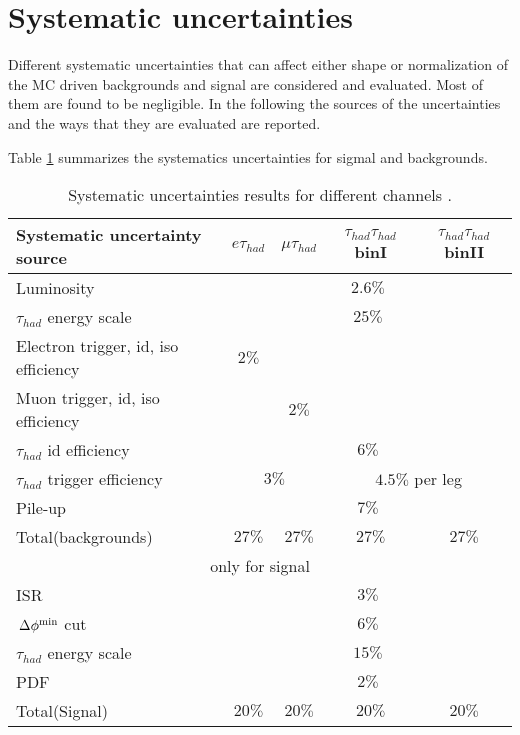\section{Systematic uncertainties}
\label{sect:sys}
Different systematic uncertainties that can affect either shape or normalization of the MC driven backgrounds
and signal are considered and evaluated.
Most of them are found to be negligible. In the following the sources of the uncertainties and the ways that they are evaluated are reported. 

Table \ref{Tab.SYS} summarizes the systematics uncertainties for sigmal and backgrounds.
\begin{table}[!Hhtb]
\begin{center}
\small{
\begin{tabular}{|l|c|c|c|c|}
\hline\hline
Systematic uncertainty source & $e\tau_{had}$ & $\mu\tau_{had}$ & $\tau_{had}\tau_{had}$ binI & $\tau_{had}\tau_{had}$ binII\\
\hline\hline
{Luminosity}&\multicolumn{4}{c|}{$2.6\%$} \\\hline
{$\tau_{had}$ energy scale}&\multicolumn{4}{c|}{$25\%$} \\\hline
{Electron trigger, id, iso efficiency}& $2\%$ & \multicolumn{3}{c|}{} \\\hline
{Muon trigger, id, iso efficiency}& &$2\%$ & \multicolumn{2}{c|}{} \\\hline
{$\tau_{had}$ id efficiency}& \multicolumn{4}{c|}{$6\%$} \\\hline
{$\tau_{had}$ trigger efficiency}& \multicolumn{2}{c|}{$3\%$}&\multicolumn{2}{c|}{$4.5\%$ per leg} \\\hline
{Pile-up}&\multicolumn{4}{c|}{$7\%$} \\\hline
Total(backgrounds) & $27\%$ & $27\%$ & $27\%$  & $27\%$\\\hline
\multicolumn{5}{|c|}{only for signal} \\\hline
{ISR}&\multicolumn{4}{c|}{$3\%$} \\\hline
{$\,{\Delta\phi^{\rm min}}$ cut}&\multicolumn{4}{c|}{$6\%$} \\\hline
{$\tau_{had}$ energy scale}&\multicolumn{4}{c|}{$15\%$} \\\hline
{PDF}&\multicolumn{4}{c|}{$2\%$} \\\hline
Total(Signal) & $20\%$ & $20\%$ & $20\%$  & $20\%$\\
\hline
\hline
\end{tabular}
}
\end{center}
\caption{  Systematic uncertainties results for different channels .}
\label{Tab.SYS}
\end{table}

